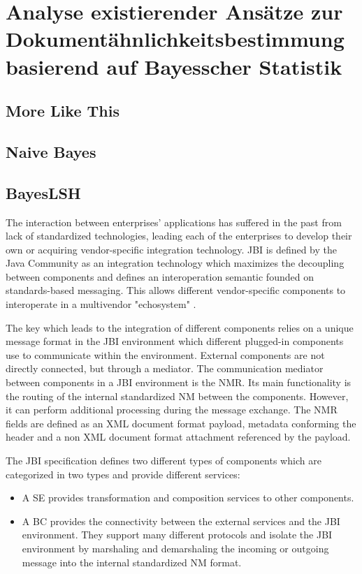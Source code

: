 \section{Analyse existierender Ansätze zur Dokumentähnlichkeitsbestimmung basierend auf Bayesscher Statistik}
\label{sec:AnalyseAnsätze}


\subsection{More Like This}
\subsection{Naive Bayes}
\subsection{BayesLSH}

The interaction between enterprises' applications has suffered in the past from lack of standardized technologies, leading each of the enterprises to develop their own or acquiring vendor-specific integration technology. \ac{JBI} is defined by the Java Community as an integration technology which maximizes the decoupling between components and defines an interoperation semantic founded on standards-based messaging. This allows different vendor-specific components to interoperate in a multivendor "echosystem" \cite{JBI2005}. 

The key which leads to the integration of different components relies on a unique message format in the \ac{JBI} environment which different plugged-in components use to communicate within the environment. External components are not directly connected, but through a mediator. The communication mediator between components in a \ac{JBI} environment is the \ac{NMR}. Its main functionality is the routing of the internal standardized \ac{NM} between the components. However, it can perform additional processing during the message exchange. The \ac{NMR} fields are defined as an \ac{XML} document format payload, metadata conforming the header and a non \ac{XML} document format attachment referenced by the payload.

The \ac{JBI} specification defines two different types of components which are categorized in two types and provide different services:
	\begin{itemize}
		\item A \ac{SE} provides transformation and composition services to other components.
		\item A \ac{BC} provides the connectivity between the external services and the \ac{JBI} environment. They support many different protocols and isolate the \ac{JBI} environment by marshaling and demarshaling the incoming or outgoing message into the internal standardized \ac{NM} format.
	\end{itemize} 
	
